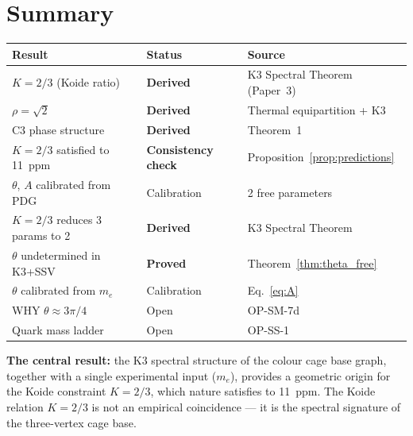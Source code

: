 \documentclass[11pt]{article}
\begin{document}
\section{Summary}

\begin{center}
\renewcommand{\arraystretch}{1.3}
\begin{tabular}{p{5.5cm}lp{5cm}}
\toprule
Result & Status & Source \\
\midrule
$K = 2/3$ (Koide ratio) & \textbf{Derived} & K3 Spectral Theorem (Paper~3) \\
$\rho = \sqrt{2}$ & \textbf{Derived} & Thermal equipartition + K3 \\
C3 phase structure & \textbf{Derived} & Theorem~1 \\
$K=2/3$ satisfied to 11~ppm & \textbf{Consistency check} & Proposition~\ref{prop:predictions} \\
$\theta$, $A$ calibrated from PDG & Calibration & 2 free parameters \\
$K=2/3$ reduces 3 params to 2 & \textbf{Derived} & K3 Spectral Theorem \\
$\theta$ undetermined in K3+SSV & \textbf{Proved} & Theorem~\ref{thm:theta_free} \\
$\theta$ calibrated from $m_e$ & Calibration & Eq.~\eqref{eq:A} \\
WHY $\theta \approx 3\pi/4$ & Open & OP-SM-7d \\
Quark mass ladder & Open & OP-SS-1 \\
\bottomrule
\end{tabular}
\end{center}

\bigskip
\noindent\textbf{The central result:} the K3 spectral structure of the
colour cage base graph, together with a single experimental input ($m_e$),
provides a geometric origin for the Koide constraint $K=2/3$, which
nature satisfies to 11~ppm.  The Koide
relation $K = 2/3$ is not an empirical coincidence — it is the spectral
signature of the three-vertex cage base.
\end{document}
